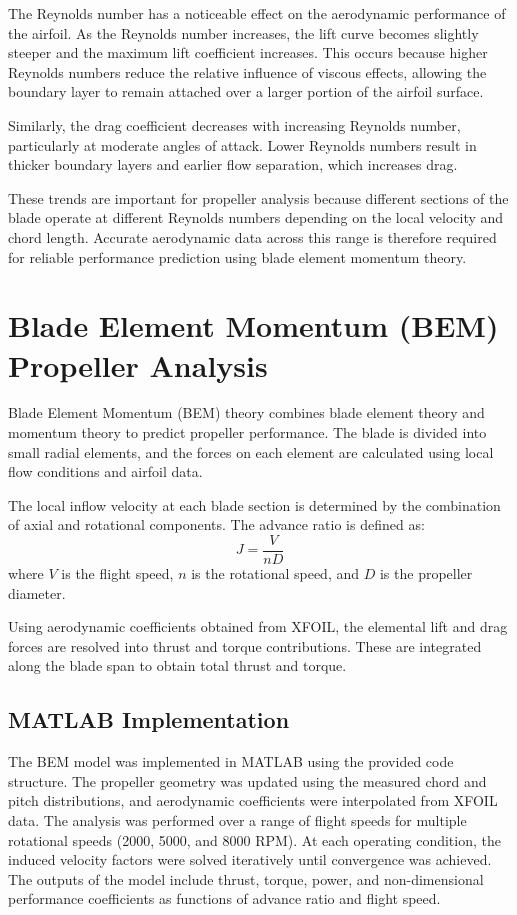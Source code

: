 \documentclass[a4paper,12pt]{article} %
\begin{document}
The Reynolds number has a noticeable effect on the aerodynamic performance of the airfoil. 
As the Reynolds number increases, the lift curve becomes slightly steeper and the maximum 
lift coefficient increases. This occurs because higher Reynolds numbers reduce the relative 
influence of viscous effects, allowing the boundary layer to remain attached over a larger 
portion of the airfoil surface.

Similarly, the drag coefficient decreases with increasing Reynolds number, particularly 
at moderate angles of attack. Lower Reynolds numbers result in thicker boundary layers 
and earlier flow separation, which increases drag.

These trends are important for propeller analysis because different sections of the blade 
operate at different Reynolds numbers depending on the local velocity and chord length. 
Accurate aerodynamic data across this range is therefore required for reliable performance 
prediction using blade element momentum theory.

\section{Blade Element Momentum (BEM) Propeller Analysis}

Blade Element Momentum (BEM) theory combines blade element theory and momentum theory to predict propeller performance. The blade is divided into small radial elements, and the forces on each element are calculated using local flow conditions and airfoil data.

The local inflow velocity at each blade section is determined by the combination of axial and rotational components. The advance ratio is defined as:
\[
J = \frac{V}{nD}
\]
where $V$ is the flight speed, $n$ is the rotational speed, and $D$ is the propeller diameter.

Using aerodynamic coefficients obtained from XFOIL, the elemental lift and drag forces are resolved into thrust and torque contributions. These are integrated along the blade span to obtain total thrust and torque.

\subsection{MATLAB Implementation}
The BEM model was implemented in MATLAB using the provided code structure. The propeller geometry was updated using the measured chord and pitch distributions, and aerodynamic coefficients were interpolated from XFOIL data. The analysis was performed over a range of flight speeds for multiple rotational speeds (2000, 5000, and 8000 RPM). At each operating condition, the induced velocity factors were solved iteratively until convergence was achieved. The outputs of the model include thrust, torque, power, and non-dimensional performance coefficients as functions of advance ratio and flight speed.
\end{document}
